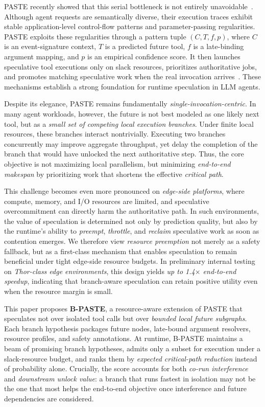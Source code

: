 \documentclass[10pt,twocolumn]{article}
\begin{document}
PASTE recently showed that this serial bottleneck is not entirely unavoidable~\cite{paste}. Although agent requests are semantically diverse, their execution traces exhibit stable application-level control-flow patterns and parameter-passing regularities. PASTE exploits these regularities through a pattern tuple $(C,T,f,p)$, where $C$ is an event-signature context, $T$ is a predicted future tool, $f$ is a late-binding argument mapping, and $p$ is an empirical confidence score. It then launches speculative tool executions only on slack resources, prioritizes authoritative jobs, and promotes matching speculative work when the real invocation arrives~\cite{paste}. These mechanisms establish a strong foundation for runtime speculation in LLM agents.

Despite its elegance, PASTE remains fundamentally \emph{single-invocation-centric}. In many agent workloads, however, the future is not best modeled as one likely next tool, but as a \emph{small set of competing local execution branches}. Under finite local resources, these branches interact nontrivially. Executing two branches concurrently may improve aggregate throughput, yet delay the completion of the branch that would have unlocked the next authoritative step. Thus, the core objective is not maximizing local parallelism, but minimizing \emph{end-to-end makespan} by prioritizing work that shortens the effective \emph{critical path}.

This challenge becomes even more pronounced on \emph{edge-side platforms}, where compute, memory, and I/O resources are limited, and speculative overcommitment can directly harm the authoritative path. In such environments, the value of speculation is determined not only by prediction quality, but also by the runtime's ability to \emph{preempt}, \emph{throttle}, and \emph{reclaim} speculative work as soon as contention emerges. We therefore view \emph{resource preemption} not merely as a safety fallback, but as a first-class mechanism that enables speculation to remain beneficial under tight edge-side resource budgets. %
In preliminary internal testing on \emph{Thor-class edge environments}, this design yields \emph{up to 1.4$\times$ end-to-end speedup}, indicating that branch-aware speculation can retain positive utility even when the resource margin is small.

This paper proposes \textbf{B-PASTE}, a resource-aware extension of PASTE that speculates not over isolated tool calls but over \emph{bounded local future subgraphs}. Each branch hypothesis packages future nodes, late-bound argument resolvers, resource profiles, and safety annotations. At runtime, B-PASTE maintains a beam of promising branch hypotheses, admits only a subset for execution under a slack-resource budget, and ranks them by \emph{expected critical-path reduction} instead of probability alone. Crucially, the score accounts for both \emph{co-run interference} and \emph{downstream unlock value}: a branch that runs fastest in isolation may not be the one that most helps the end-to-end objective once interference and future dependencies are considered.
\end{document}
